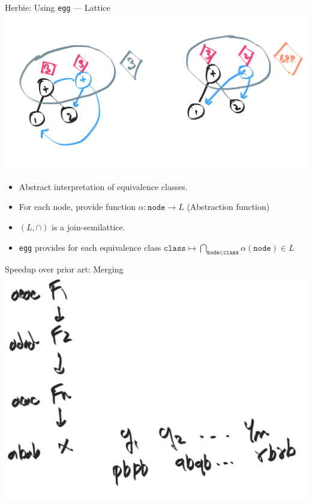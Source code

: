 \documentclass[8pt]{beamer}
\newcommand{\node}{\texttt{node}}
\newcommand{\class}{\texttt{class}}
\newcommand{\egg}{\texttt{egg} }
\begin{document}
\begin{frame}[fragile]{Herbie: Using \egg --- Lattice}
\includegraphics[width=\textwidth]{./analysis-equivalence-classes.png}
\pause
\begin{itemize}
\item Abstract interpretation of equivalence classes.
\item For each node, provide function $\alpha: \node \rightarrow L$ (Abstraction function)
\item $(L, \cap)$ is a join-semilattice.
\item \egg provides for each equivalence class $\class \mapsto \bigcap_{\node \in \class} \alpha(\node) \in L$
\end{itemize}
\end{frame}


\begin{frame}[fragile]{Speedup over prior art: Merging}
\includegraphics[width=\textwidth]{./eg-2-1.png}
\end{frame}
\end{document}
